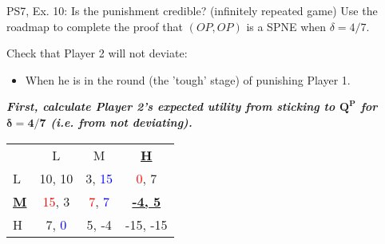 \begin{frame}{PS7, Ex. 10: Is the punishment credible? (infinitely repeated game)}
    Use the roadmap to complete the proof that $(OP,OP)$ is a SPNE when $\delta=4/7$.\vspace{-4pt}
    \begin{multicols}{2}
      Check that Player 2 will not deviate:
      \begin{itemize}
        \item[4.] When he is in the  round (the 'tough' stage) of punishing Player 1.
      \end{itemize}
      \textbf{\textit{First, calculate Player 2's expected utility from sticking to $\bm{Q^P}$ for $\bm{\delta=4/7}$ (i.e. from not deviating).}}
      \vfill\null\columnbreak
      \vspace{-6pt}
      \begin{table}
        \begin{tabular}{l|c|c|c|}
          \multicolumn{1}{c}{} & \multicolumn{1}{c}{L} & \multicolumn{1}{c}{M} & \multicolumn{1}{c}{\textbf{\underline{H}}} \\\cline{2-4}
          L & 10, 10 & 3, \textcolor{blue}{15} & \textcolor{red}{0}, 7 \\\cline{2-4}
          \textbf{\underline{M}} & \textcolor{red}{15}, 3 & \textcolor{red}{7}, \textcolor{blue}{7} & \textbf{\underline{-4, 5}} \\\cline{2-4}
          H & 7, \textcolor{blue}{0} & 5, -4 & -15, -15 \\\cline{2-4}
        \end{tabular}
      \end{table}
      \vfill\null
    \end{multicols}
    \vfill\null
\end{frame}

